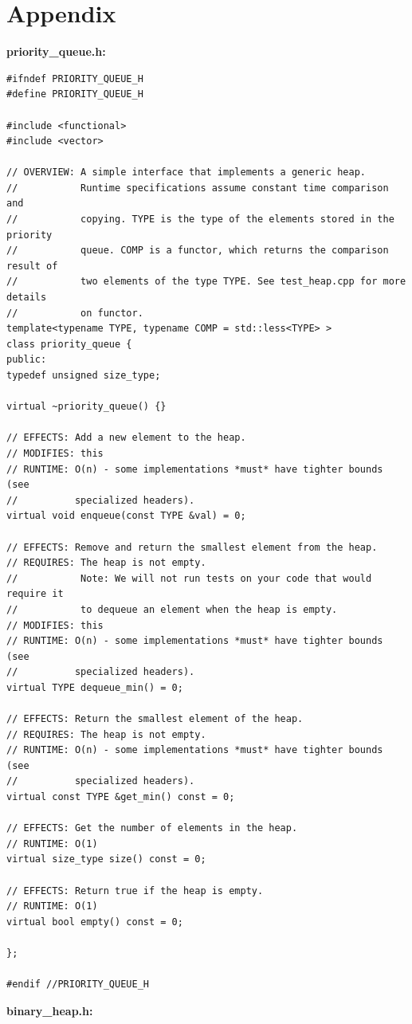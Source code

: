 \documentclass[12pt,a4paper]{article}
\theoremstyle{definition}
\begin{document}
\section{Appendix}
   \noindent \textbf{priority\_queue.h:}
 \begin{lstlisting}[caption={priority\_queue.h}]
#ifndef PRIORITY_QUEUE_H
#define PRIORITY_QUEUE_H

#include <functional>
#include <vector>

// OVERVIEW: A simple interface that implements a generic heap.
//           Runtime specifications assume constant time comparison and
//           copying. TYPE is the type of the elements stored in the priority
//           queue. COMP is a functor, which returns the comparison result of
//           two elements of the type TYPE. See test_heap.cpp for more details
//           on functor.
template<typename TYPE, typename COMP = std::less<TYPE> >
class priority_queue {
public:
typedef unsigned size_type;

virtual ~priority_queue() {}

// EFFECTS: Add a new element to the heap.
// MODIFIES: this
// RUNTIME: O(n) - some implementations *must* have tighter bounds (see
//          specialized headers).
virtual void enqueue(const TYPE &val) = 0;

// EFFECTS: Remove and return the smallest element from the heap.
// REQUIRES: The heap is not empty.
//           Note: We will not run tests on your code that would require it
//           to dequeue an element when the heap is empty.
// MODIFIES: this
// RUNTIME: O(n) - some implementations *must* have tighter bounds (see
//          specialized headers).
virtual TYPE dequeue_min() = 0;

// EFFECTS: Return the smallest element of the heap.
// REQUIRES: The heap is not empty.
// RUNTIME: O(n) - some implementations *must* have tighter bounds (see
//          specialized headers).
virtual const TYPE &get_min() const = 0;

// EFFECTS: Get the number of elements in the heap.
// RUNTIME: O(1)
virtual size_type size() const = 0;

// EFFECTS: Return true if the heap is empty.
// RUNTIME: O(1)
virtual bool empty() const = 0;

};

#endif //PRIORITY_QUEUE_H

 \end{lstlisting}
\newpage
   \noindent \textbf{binary\_heap.h:}
\end{document}
